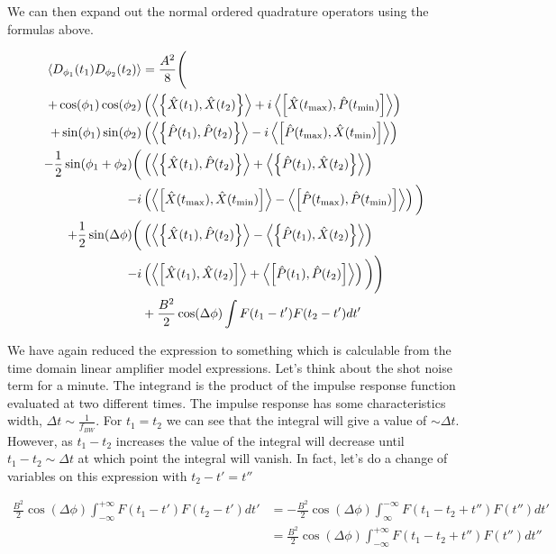 \documentclass[12pt]{article}
\begin{document}
We can then expand out the normal ordered quadrature operators using the formulas above.

\begin{align}
\Braket{D_{\phi_1}(t_1)D_{\phi_2}(t_2)} &=\frac{A^2}{8}\Bigg(\\
+\cos(\phi_1)\cos(\phi_2)&\left(\Braket{\left\{\hat{X}(t_1),\hat{X}(t_2)\right\}}+i\Braket{\left[\hat{X}(t_{\text{max}}),\hat{P}(t_{\text{min}})\right]}\right)\\
+\sin(\phi_1)\sin(\phi_2)&\left(\Braket{\left\{\hat{P}(t_1),\hat{P}(t_2)\right\}}-i\Braket{\left[\hat{P}(t_{\text{max}}),\hat{X}(t_{\text{min}})\right]}\right)\\
-\frac{1}{2}\sin(\phi_1+\phi_2)\bigg(&\left(\Braket{\left\{\hat{X}(t_1),\hat{P}(t_2)\right\}}+\Braket{\left\{\hat{P}(t_1),\hat{X}(t_2)\right\}}\right)\\
-i&\left(\Braket{\left[\hat{X}(t_{\text{max}}),\hat{X}(t_{\text{min}})\right]}-\Braket{\left[\hat{P}(t_{\text{max}}),\hat{P}(t_{\text{min}})\right]}\right)\bigg)\\
+\frac{1}{2}\sin(\Delta\phi)\bigg(&\left(\Braket{\left\{\hat{X}(t_1),\hat{P}(t_2)\right\}}-\Braket{\left\{\hat{P}(t_1),\hat{X}(t_2)\right\}}\right)\\
-i&\left(\Braket{\left[\hat{X}(t_1),\hat{X}(t_2)\right]}+\Braket{\left[\hat{P}(t_1),\hat{P}(t_2)\right]}\right)\bigg)\Bigg)\\
&+\frac{B^2}{2}\cos(\Delta\phi)\int F(t_1-t')F(t_2-t')dt'
\end{align}

We have again reduced the expression to something which is calculable from the time domain linear amplifier model expressions. Let's think about the shot noise term for a minute. The integrand is the product of the impulse response function evaluated at two different times. The impulse response has some characteristics width, $\Delta t \sim \frac{1}{f_{BW}}$. For $t_1=t_2$ we can see that the integral will give a value of $\sim \Delta t$. However, as $t_1-t_2$ increases the value of the integral will decrease until $t_1-t_2 \sim \Delta t$ at which point the integral will vanish. In fact, let's do a change of variables on this expression with $t_2-t' = t''$

\begin{align}
\frac{B^2}{2}\cos(\Delta \phi)\int_{-\infty}^{+\infty} F(t_1-t')F(t_2-t')dt' &= -\frac{B^2}{2}\cos(\Delta\phi)\int_{\infty}^{-\infty} F(t_1-t_2+t'')F(t'')dt'\\
&=\frac{B^2}{2}\cos(\Delta \phi)\int_{-\infty}^{+\infty}F(t_1-t_2+t'')F(t'')dt''
\end{align}
\end{document}
